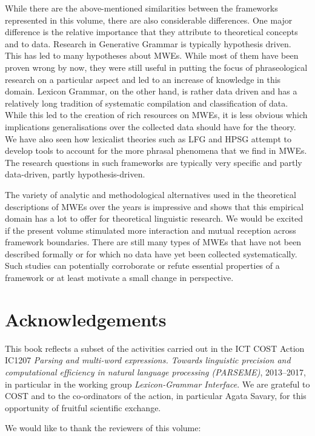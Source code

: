 \documentclass[output=paper]{langsci/langscibook}
\begin{document}
While there are the above-mentioned similarities between the frameworks represented in this volume, there are also considerable differences. One major difference is the relative importance that they attribute to theoretical concepts and to data. 
Research in Generative Grammar is typically hypothesis driven. This has led to many hypotheses about MWEs. While most of them have been proven wrong by now, they were still useful in putting the focus of phraseological research on a particular aspect and led to an increase of knowledge in this domain.  
Lexicon Grammar, on the other hand, is rather data driven and has a relatively long tradition of systematic compilation and classification of data. While this led to the creation of rich resources on MWEs, it is less obvious which implications generalisations over the collected data should have for the theory. 
We have also seen how lexicalist theories such as LFG and HPSG attempt to develop tools to account for the more phrasal phenomena that we find in MWEs. 
The research questions in such frameworks are typically very specific and partly data-driven, partly hypothesis-driven.

The variety of analytic and methodological alternatives used in the theoretical descriptions of MWEs over the years is impressive and shows that this empirical domain has a lot to offer for theoretical linguistic research. 
We would be excited if the present volume stimulated more interaction and mutual reception across framework boundaries. 
There are still many types of MWEs that have not been described formally or for which no data have yet been collected systematically. 
Such studies can potentially corroborate or refute essential properties of a framework or at least motivate a small change in perspective.



\section*{Acknowledgements} 
This book reflects a subset of the activities carried out in the ICT COST Action IC1207 \textit{Parsing and multi-word expressions. Towards linguistic precision and computational efficiency in natural language processing (PARSEME)}, 2013--2017, in particular in the working group \emph{Lexicon-Grammar Interface}. We are grateful to COST and to the co-ordinators of the action, in particular Agata Savary, for this opportunity of fruitful scientific exchange. 

We would like to thank the reviewers of this volume:
 
\end{document}
